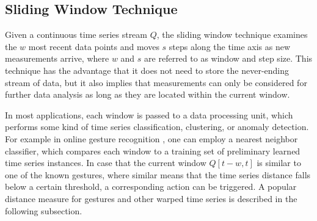 \subsection{Sliding Window Technique} \label{sliding_window_technique}

Given a continuous time series stream $Q$, the sliding window technique examines the $w$ most recent data points and moves $s$ steps along the time axis as new measurements arrive, where $w$ and $s$ are referred to as window and step size. This technique has the advantage that it does not need to store the never-ending stream of data, but it also implies that measurements can only be considered for further data analysis as long as they are located within the current window. 

In most applications, each window is passed to a data processing unit, which performs some kind of time series classification, clustering, or anomaly detection. For example in online gesture recognition \cite{lesti2017filter}, one can employ a nearest neighbor classifier, which compares each window to a training set of preliminary learned time series instances. In case that the current window $Q[t-w,t]$ is similar to one of the known gestures, where similar means that the time series distance falls below a certain threshold, a corresponding action can be triggered. A popular distance measure for gestures \cite{liu2009uwave} and other warped time series is described in the following subsection.
